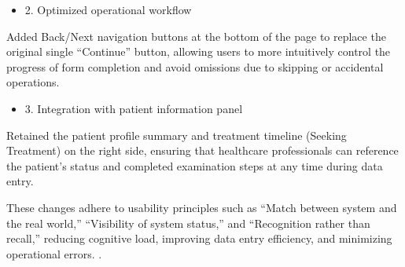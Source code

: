 \begin{itemize}
    \item 2. Optimized operational workflow
\end{itemize}
Added Back/Next navigation buttons at the bottom of the page to replace the original single “Continue” button, allowing users to more intuitively control the progress of form completion and avoid omissions due to skipping or accidental operations.

\begin{itemize}
    \item 3. Integration with patient information panel
\end{itemize}
Retained the patient profile summary and treatment timeline (Seeking Treatment) on the right side, ensuring that healthcare professionals can reference the patient's status and completed examination steps at any time during data entry.

These changes adhere to usability principles such as “Match between system and the real world,” “Visibility of system status,” and “Recognition rather than recall,” reducing cognitive load, improving data entry efficiency, and minimizing operational errors. \cite{nielsen1995}.

